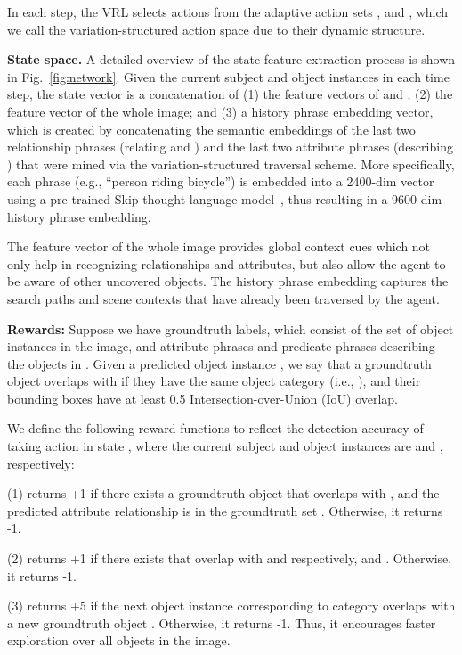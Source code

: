 \documentclass[10pt,twocolumn,letterpaper]{article}
\begin{document}
In each step, the VRL selects actions from the adaptive action sets , and , which we call the variation-structured action space due to their dynamic structure.


 
\textbf{State space.} A detailed overview of the state feature extraction process is shown in Fig.~\ref{fig:network}. Given the current subject  and object  instances in each time step, the state vector  is a concatenation of (1) the feature vectors of  and ; (2) the feature vector of the whole image; and (3) a history phrase embedding vector, which is created by concatenating the semantic embeddings of the last two relationship phrases (relating  and ) and the last two attribute phrases (describing ) that were mined via the variation-structured traversal scheme. More specifically, each phrase (e.g., ``person riding bicycle'') is embedded into a 2400-dim vector using a pre-trained Skip-thought language model~\cite{kiros2015skip}, thus resulting in a 9600-dim history phrase embedding. 

The feature vector of the whole image provides global context cues which not only help in recognizing relationships and attributes, but also allow the agent to be aware of other uncovered objects. The history phrase embedding captures the search paths and scene contexts that have already been traversed by the agent.

\textbf{Rewards:} Suppose we have groundtruth labels, which consist of the set  of object instances in the image, and attribute phrases  and predicate phrases  describing the objects in . Given a predicted object instance , we say that a groundtruth object  overlaps with  if they have the same object category (i.e., ), and their bounding boxes have at least 0.5 Intersection-over-Union (IoU) overlap.

We define the following reward functions to reflect the detection accuracy of taking action  in state , where the current subject and object instances are  and , respectively:

(1)  returns +1 if there exists a groundtruth object  that overlaps with , and the predicted attribute relationship  is in the groundtruth set . Otherwise, it returns -1.

(2)  returns +1 if there exists  that overlap with  and  respectively, and . Otherwise, it returns -1.

(3)  returns +5 if the next object instance  corresponding to category  overlaps with a new groundtruth object . Otherwise, it returns -1. Thus, it encourages faster exploration over all objects in the image.
\end{document}

